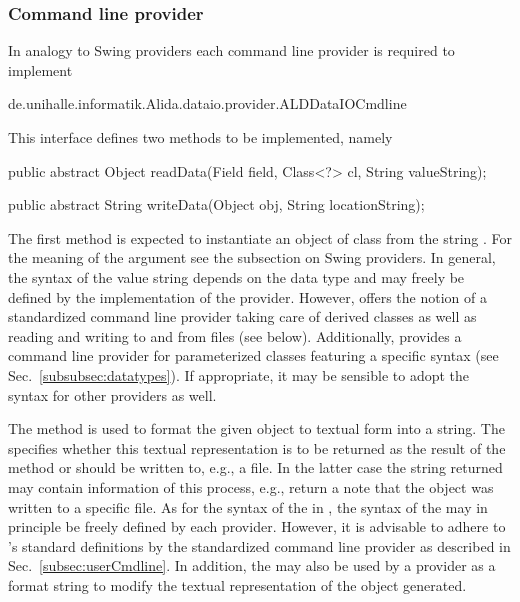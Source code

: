 \subsubsection{Command line provider}
\label{subsubsec:implProviderCmdline}

In analogy to Swing providers each command line provider is required to
implement 
\vspace*{0.5cm}
\begin{code}
	de.unihalle.informatik.Alida.dataio.provider.ALDDataIOCmdline
\end{code}

\vspace*{-0.25cm}	
This interface defines two methods to be implemented, namely
\vspace*{0.5cm}
\begin{code}
  public abstract Object readData(Field field, Class<?> cl, String valueString);

  public abstract String writeData(Object obj, String locationString);
\end{code}

\vspace*{-0.25cm}
The first method is expected to instantiate an object of class  from
the string .
For the meaning of the argument  see the subsection
on Swing providers.
In general, the syntax of the value string depends on the data type
and may freely be defined  by the implementation of the provider.
However, \alida offers the notion of a standardized command line provider
taking care of derived classes as  well as reading and writing to and from files
(see below).
Additionally, \alida provides a command line provider for parameterized classes
featuring a specific syntax (see Sec.~\ref{subsubsec:datatypes}).  
If appropriate, it may be sensible to adopt the syntax for other
providers as well.

The method  is used to format the given object to textual
form into a string.
The  specifies whether this textual representation is
to be returned as the result of the method or should be written to, e.g., a
file.
In the latter case the string returned may contain information of this process,
e.g., return a note that the object was written to a specific file.
As for the syntax of  the  in , the
syntax of the    may in principle be freely defined by each
provider.
However, it is advisable to adhere to \alida's standard definitions by the
standardized command line provider as described in
Sec.~\ref{subsec:userCmdline}.
In addition, the  may also be used by a provider as
a format string to modify the textual representation of the object generated.


